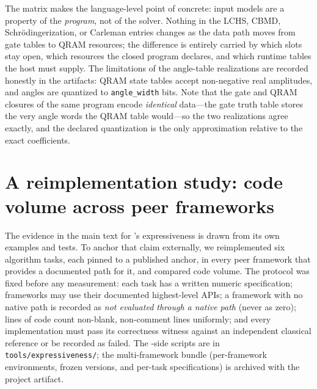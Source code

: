 The matrix makes the language-level point of
 concrete: input models are a property
of the \emph{program}, not of the solver.  Nothing in the LCHS, CBMD,
Schr\"odingerization, or Carleman entries changes as the data path moves
from gate tables to QRAM resources; the difference is entirely carried by
which slots stay open, which resources the closed program declares, and
which runtime tables the host must supply.  The limitations of the
angle-table realizations are recorded honestly in the artifacts: QRAM
state tables accept non-negative real amplitudes, and angles are
quantized to \texttt{angle\_width} bits.  Note that the gate and QRAM
closures of the same program encode \emph{identical} data---the gate
truth table stores the very angle words the QRAM table would---so the two
realizations agree exactly, and the declared quantization is the only
approximation relative to the exact coefficients.

\section{A reimplementation study: code volume across peer frameworks}
\label{app:expressiveness}

The evidence in the main text for \pqlang's expressiveness is drawn from its
own examples and tests.  To anchor that claim externally, we reimplemented
six algorithm tasks, each pinned to a published anchor, in every peer
framework that provides a documented path for it, and compared code
volume.  The protocol was fixed before any measurement: each task has a
written numeric specification; frameworks may use their documented
highest-level APIs; a framework with no native path is recorded as
\emph{not evaluated through a native path} (never as zero); lines of code count non-blank,
non-comment lines uniformly; and every implementation must pass its
correctness witness against an independent classical reference or be
recorded as failed.  The \pqlang-side scripts are in
\texttt{tools/expressiveness/}; the multi-framework bundle (per-framework
environments, frozen versions, and per-task specifications) is archived
with the project artifact.

